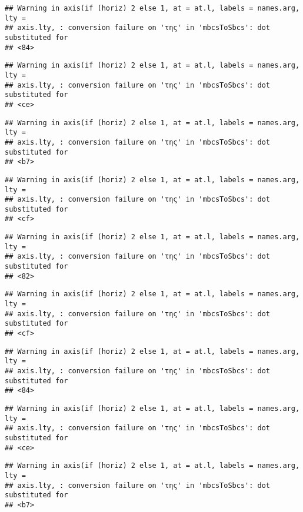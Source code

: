 \documentclass[
]{article}
\begin{document}
\begin{verbatim}
## Warning in axis(if (horiz) 2 else 1, at = at.l, labels = names.arg, lty =
## axis.lty, : conversion failure on 'της' in 'mbcsToSbcs': dot substituted for
## <84>
\end{verbatim}

\begin{verbatim}
## Warning in axis(if (horiz) 2 else 1, at = at.l, labels = names.arg, lty =
## axis.lty, : conversion failure on 'της' in 'mbcsToSbcs': dot substituted for
## <ce>
\end{verbatim}

\begin{verbatim}
## Warning in axis(if (horiz) 2 else 1, at = at.l, labels = names.arg, lty =
## axis.lty, : conversion failure on 'της' in 'mbcsToSbcs': dot substituted for
## <b7>
\end{verbatim}

\begin{verbatim}
## Warning in axis(if (horiz) 2 else 1, at = at.l, labels = names.arg, lty =
## axis.lty, : conversion failure on 'της' in 'mbcsToSbcs': dot substituted for
## <cf>
\end{verbatim}

\begin{verbatim}
## Warning in axis(if (horiz) 2 else 1, at = at.l, labels = names.arg, lty =
## axis.lty, : conversion failure on 'της' in 'mbcsToSbcs': dot substituted for
## <82>
\end{verbatim}

\begin{verbatim}
## Warning in axis(if (horiz) 2 else 1, at = at.l, labels = names.arg, lty =
## axis.lty, : conversion failure on 'της' in 'mbcsToSbcs': dot substituted for
## <cf>
\end{verbatim}

\begin{verbatim}
## Warning in axis(if (horiz) 2 else 1, at = at.l, labels = names.arg, lty =
## axis.lty, : conversion failure on 'της' in 'mbcsToSbcs': dot substituted for
## <84>
\end{verbatim}

\begin{verbatim}
## Warning in axis(if (horiz) 2 else 1, at = at.l, labels = names.arg, lty =
## axis.lty, : conversion failure on 'της' in 'mbcsToSbcs': dot substituted for
## <ce>
\end{verbatim}

\begin{verbatim}
## Warning in axis(if (horiz) 2 else 1, at = at.l, labels = names.arg, lty =
## axis.lty, : conversion failure on 'της' in 'mbcsToSbcs': dot substituted for
## <b7>
\end{verbatim}
\end{document}
